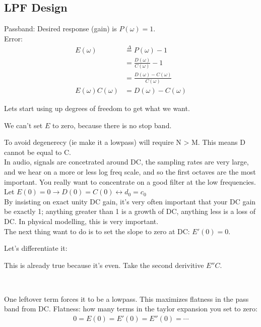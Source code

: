 \subsection*{LPF Design}

Passband: Desired response (gain) is $P(\omega) = 1$. \\

Error: 
\begin{align*}
    E(\omega) &\stackrel{\Delta}{=} P(\omega) - 1\\
    &= \frac{D(\omega)}{C(\omega)} - 1 \\
    &= \frac{D(\omega) - C(\omega)}{C(\omega)} \\
    E(\omega)C(\omega) &= D(\omega) - C(\omega)
\end{align*}

Lets start using up degrees of freedom to get what we want. 

We can't set $E$ to zero, because there is no stop band. 

To avoid degenerecy (ie make it a lowpass) will require N > M. This means
D cannot be equal to C. \\

In audio, signals are concetrated around DC, the sampling rates are very large,
and we hear on a more or less log freq scale, and so the first octaves are
the most important. You really want to concentrate on a good filter at the low
frequencies. \\

Let $E(0) = 0 \rightarrow D(0) = C(0) \leftrightarrow d_0 = c_0$ \\

By insisting on exact unity DC gain, it's very often important that your
DC gain be exactly 1; anything greater than 1 is a growth of DC, anything less
is a loss of DC. In physical modelling, this is very important.\\

The next thing want to do is to set the slope to zero at DC: $E'(0) = 0$.

Let's differentiate it:


This is already true because it's even. Take the second derivitive $E''C$.

 \\

One leftover term forces it to be a lowpass. This maximizes flatness in
the pass band from DC. Flatness: how many terms in the taylor expansion you set to zero:
\begin{align*}
    0 = E(0) = E'(0) = E''(0) = \cdots 
\end{align*}


